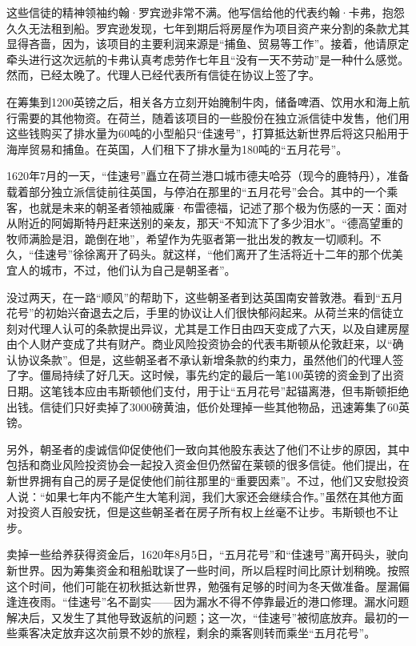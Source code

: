 \documentclass[12pt,oneside]{book}
\begin{document}
\begin{bookref}[frametitle={\cite{美国四百年}}]
这些信徒的精神领袖约翰·罗宾逊非常不满。他写信给他的代表约翰·卡弗，抱怨久久无法租到船。罗宾逊发现，七年到期后将房屋作为项目资产来分割的条款尤其显得吝啬，因为，该项目的主要利润来源是“捕鱼、贸易等工作”。接着，他请原定牵头进行这次远航的卡弗认真考虑劳作七年且“没有一天不劳动”是一种什么感觉。然而，已经太晚了。代理人已经代表所有信徒在协议上签了字。

在筹集到1200英镑之后，相关各方立刻开始腌制牛肉，储备啤酒、饮用水和海上航行需要的其他物资。在荷兰，随着该项目的一些股份在独立派信徒中发售，他们用这些钱购买了排水量为60吨的小型船只“佳速号”，打算抵达新世界后将这只船用于海岸贸易和捕鱼。在英国，人们租下了排水量为180吨的“五月花号”。

1620年7月的一天，“佳速号”矗立在荷兰港口城市德夫哈芬（现今的鹿特丹），准备载着部分独立派信徒前往英国，与停泊在那里的“五月花号”会合。其中的一个乘客，也就是未来的朝圣者领袖威廉·布雷德福，记述了那个极为伤感的一天：面对从附近的阿姆斯特丹赶来送别的亲友，那天“不知流下了多少泪水”。“德高望重的牧师满脸是泪，跪倒在地”，希望作为先驱者第一批出发的教友一切顺利。不久，“佳速号”徐徐离开了码头。就这样，“他们离开了生活将近十二年的那个优美宜人的城市，不过，他们认为自己是朝圣者”。

没过两天，在一路“顺风”的帮助下，这些朝圣者到达英国南安普敦港。看到“五月花号”的初始兴奋退去之后，手里的协议让人们很快郁闷起来。从荷兰来的信徒立刻对代理人认可的条款提出异议，尤其是工作日由四天变成了六天，以及自建房屋由个人财产变成了共有财产。商业风险投资协会的代表韦斯顿从伦敦赶来，以“确认协议条款”。但是，这些朝圣者不承认新增条款的约束力，虽然他们的代理人签了字。僵局持续了好几天。这时候，事先约定的最后一笔100英镑的资金到了出资日期。这笔钱本应由韦斯顿他们支付，用于让“五月花号”起锚离港，但韦斯顿拒绝出钱。信徒们只好卖掉了3000磅黄油，低价处理掉一些其他物品，迅速筹集了60英镑。

另外，朝圣者的虔诚信仰促使他们一致向其他股东表达了他们不让步的原因，其中包括和商业风险投资协会一起投入资金但仍然留在莱顿的很多信徒。他们提出，在新世界拥有自己的房子是促使他们前往那里的“重要因素”。不过，他们又安慰投资人说：“如果七年内不能产生大笔利润，我们大家还会继续合作。”虽然在其他方面对投资人百般安抚，但是这些朝圣者在房子所有权上丝毫不让步。韦斯顿也不让步。

卖掉一些给养获得资金后，1620年8月5日，“五月花号”和“佳速号”离开码头，驶向新世界。因为筹集资金和租船耽误了一些时间，所以启程时间比原计划稍晚。按照这个时间，他们可能在初秋抵达新世界，勉强有足够的时间为冬天做准备。屋漏偏逢连夜雨。“佳速号”名不副实——因为漏水不得不停靠最近的港口修理。漏水问题解决后，又发生了其他导致返航的问题；这一次，“佳速号”被彻底放弃。最初的一些乘客决定放弃这次前景不妙的旅程，剩余的乘客则转而乘坐“五月花号”。


\end{bookref}
\end{document}
